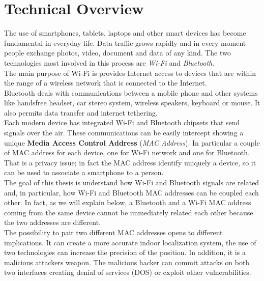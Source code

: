\chapter{Technical Overview}
\thispagestyle{empty}

The use of smartphones, tablets, laptops and other smart devices has become fundamental in everyday life. Data traffic grows rapidly and in every moment people exchange photos, video, document and data of any kind. The two technologies most involved in this process are \textit{Wi-Fi} and \textit{Bluetooth}.\\
The main purpose of Wi-Fi is provides Internet access to devices that are within the range of a wireless network that is connected to the Internet.\\
Bluetooth deals with communications between a mobile phone and other systems like handsfree headset, car stereo system, wireless speakers, keyboard or mouse. It also permits data transfer and internet tethering.\\
\linebreak
Each modern device has integrated Wi-Fi and Bluetooth chipsets that send signals over the air. These communications can be easily intercept showing a unique \textbf{Media Access Control Address} (\textit{MAC Address}). In particular a couple of MAC address for each device, one for Wi-Fi network and one for Bluetooth. \\
That is a privacy issue; in fact the MAC address identify uniquely a device, so it can be used to associate a smartphone to a person.\\
\linebreak
The goal of this thesis is understand how Wi-Fi and Bluetooth signals are related and, in particular, how Wi-Fi and Bluetooth MAC addresses can be coupled each other. In fact, as we will explain below, a Bluetooth and a Wi-Fi MAC address coming from the same device cannot be immediately related each other because the two addresses are different.\\
The possibility to pair two different MAC addresses opens to different implications. It can create a more accurate indoor localization system, the use of two technologies can increase the precision of the position. In addition, it is a malicious attackers weapon. The malicious hacker can commit attacks on both two interfaces creating denial of services (DOS) or exploit other vulnerabilities.

